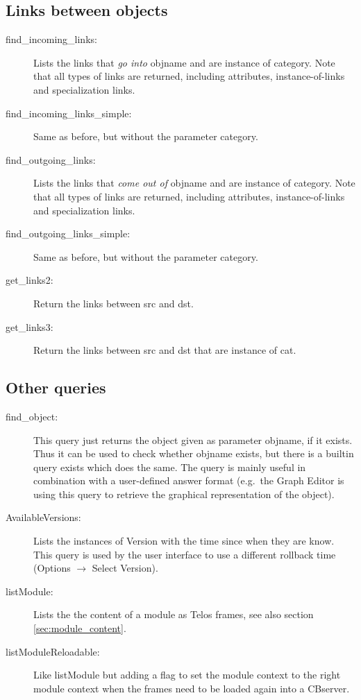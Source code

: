 \subsection{Links between objects}

\begin{description}
\item[find\_incoming\_links:] Lists the links that {\em go into} {\ttfamily objname} and are instance
of {\ttfamily category}. Note that all types of links are returned, including attributes,
instance-of-links and specialization links.
\item[find\_incoming\_links\_simple:] Same as before, but without the parameter {\ttfamily category}.
\item[find\_outgoing\_links:] Lists the links that {\em come out of} {\ttfamily objname} and are instance
of {\ttfamily category}. Note that all types of links are returned, including attributes,
instance-of-links and specialization links.
\item[find\_outgoing\_links\_simple:] Same as before, but without the parameter {\ttfamily category}.
\item[get\_links2:] Return the links between {\ttfamily src} and {\ttfamily dst}.
\item[get\_links3:] Return the links between {\ttfamily src} and {\ttfamily dst} that are
instance of {\ttfamily cat}.
\end{description}

\subsection{Other queries}

\begin{description}
\item[find\_object:] This query just returns the object given as parameter {\ttfamily objname},
if it exists. Thus it can be used to check whether {\ttfamily objname} exists, but
there is a builtin query {\ttfamily exists} which does the same. The query is
mainly useful in combination with a user-defined answer format (e.g.\ the Graph Editor
is using this query to retrieve the graphical representation of the object).
\item[AvailableVersions:] Lists the instances of {\ttfamily Version} with
the time since when they are know. This query is used by the user interface
to use a different rollback time (Options $\rightarrow$ Select Version).
\item[listModule:] Lists the the content of a module as Telos frames, see
also section \ref{sec:module_content}.
\item[listModuleReloadable:] Like listModule but adding a flag to set the module context to the right module context when the frames need to be loaded again into a CBserver.
\end{description}


